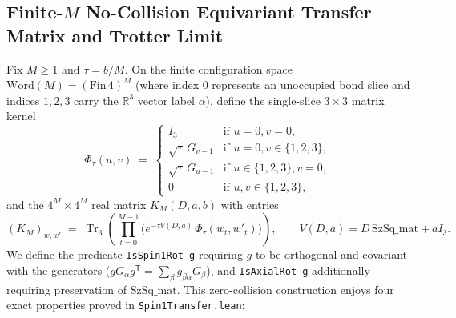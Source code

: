 \documentclass[11pt,a4paper]{article}
\newcommand{\id}[1]{{\small\nolinkurl{#1}}}
\newcommand{\Tr}{\operatorname{Tr}}
\newcommand{\R}{\mathbb{R}}
\begin{document}
\subsection{Finite-$M$ No-Collision Equivariant Transfer Matrix and Trotter Limit}
Fix $M \ge 1$ and $\tau = b / M$. On the finite configuration space $\mathrm{Word}(M) = (\mathrm{Fin}\,4)^M$ (where index $0$ represents an unoccupied bond slice and indices $1, 2, 3$ carry the $\R^3$ vector label $\alpha$), define the single-slice $3 \times 3$ matrix kernel
\[
  \Phi_\tau(u, v) \;=\; \begin{cases}
    I_3 & \text{if } u = 0, v = 0, \\
    \sqrt{\tau}\, G_{v-1} & \text{if } u = 0, v \in \{1,2,3\}, \\
    \sqrt{\tau}\, G_{u-1} & \text{if } u \in \{1,2,3\}, v = 0, \\
    0 & \text{if } u, v \in \{1,2,3\},
  \end{cases}
\]
and the $4^M \times 4^M$ real matrix $K_M(D, a, b)$ with entries
\[
  (K_M)_{w, w'} \;=\; \Tr_3\!\left(\prod_{t=0}^{M-1} \Big(e^{-\tau V(D, a)} \, \Phi_\tau(w_t, w'_t)\Big)\right), \qquad V(D, a) = D\,\mathrm{SzSq\_mat} + a I_3.
\]
We define the predicate \id{IsSpin1Rot g} requiring $g$ to be orthogonal and covariant with the generators ($g G_\alpha g^\mathsf{T} = \sum_\beta g_{\beta\alpha} G_\beta$), and \id{IsAxialRot g} additionally requiring preservation of $\mathrm{SzSq\_mat}$. This zero-collision construction enjoys four exact properties proved in \id{Spin1Transfer.lean}:
\end{document}
